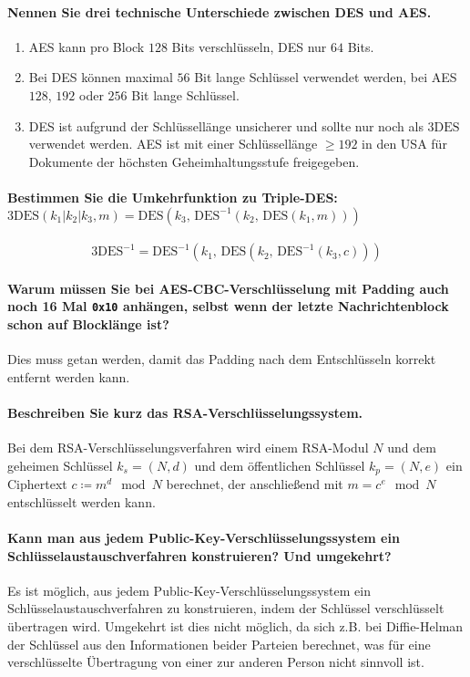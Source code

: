 \paragraph{Nennen Sie drei technische Unterschiede zwischen DES und AES.}
\begin{enumerate}
	\item AES kann pro Block \(128\) Bits verschlüsseln, DES nur \(64\) Bits.
	\item Bei DES können maximal \(56\) Bit lange Schlüssel verwendet werden, bei AES \(128\), \(192\) oder \(256\) Bit lange Schlüssel.
	\item DES ist aufgrund der Schlüssellänge unsicherer und sollte nur noch als \(\textrm{3DES}\) verwendet werden. AES ist mit einer Schlüssellänge \( \geq 192 \) in den USA für Dokumente der höchsten Geheimhaltungsstufe freigegeben.
\end{enumerate}

\paragraph{Bestimmen Sie die Umkehrfunktion zu Triple-DES: \(\textrm{3DES}(k_1 \vert k_2 \vert k_3, m) = \textrm{DES}(k_3, \,\textrm{DES}^{-1}(k_2, \,\textrm{DES}(k_1, m)))\)}
\begin{equation*}
	\textrm{3DES}^{-1} = \textrm{DES}^{-1}(k_1, \,\textrm{DES}(k_2, \,\textrm{DES}^{-1}(k_3, c)))
\end{equation*}

\paragraph{Warum müssen Sie bei AES-CBC-Verschlüsselung mit Padding auch noch 16 Mal \texttt{0x10} anhängen, selbst wenn der letzte Nachrichtenblock schon auf Blocklänge ist?}
Dies muss getan werden, damit das Padding nach dem Entschlüsseln korrekt entfernt werden kann.

\paragraph{Beschreiben Sie kurz das RSA-Verschlüsselungssystem.}
Bei dem RSA-Verschlüsselungsverfahren wird einem RSA-Modul \(N\) und dem geheimen Schlüssel \(k_s = (N, d)\) und dem öffentlichen Schlüssel \(k_p = (N, e)\) ein Ciphertext \( c \coloneqq m^d \mod N \) berechnet, der anschließend mit \( m = c^e \mod N \) entschlüsselt werden kann.

\paragraph{Kann man aus jedem Public-Key-Verschlüsselungssystem ein Schlüsselaustauschverfahren konstruieren? Und umgekehrt?}
	Es ist möglich, aus jedem Public-Key-Verschlüsselungssystem ein Schlüsselaustauschverfahren zu konstruieren, indem der Schlüssel verschlüsselt übertragen wird. Umgekehrt ist dies nicht möglich, da sich z.B. bei Diffie-Helman der Schlüssel aus den Informationen beider Parteien berechnet, was für eine verschlüsselte Übertragung von einer zur anderen Person nicht sinnvoll ist.

